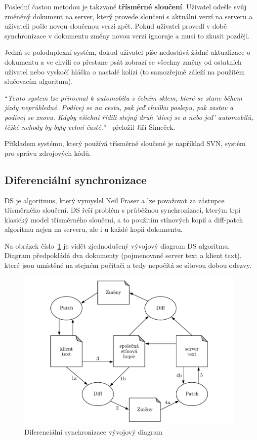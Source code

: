 Poslední častou metodou je takzvané \textbf{třísměrné sloučení}.
Uživatel odešle svůj změněný dokument na server, který provede sloučení s aktuální verzí na serveru a uživateli pošle novou sloučenou verzi zpět.
Pokud uživatel provedl v době synchronizace v dokumentu změny novou verzi ignoruje a musí to zkusit později.

Jedná se poloduplexní systém, dokud uživatel píše nedostává žádné aktualizace o dokumentu a ve chvíli co přestane psát zobrazí se všechny změny od ostatních uživatel nebo vyskočí hláška o nastalé kolizi (to samozřejmě záleží na použitém slučovacím algoritmu).~\cite{ds:neil_paper, ds:neil_video}

\enquote{\textit{Tento system lze přirovnat k automobilu s čelním sklem, které se stane během jízdy neprůhledné.
Podívej se na cestu, pak jeď chvilku poslepu, pak zastav a podívej se znovu.
Kdyby všichni řídili stejný druh \enquote{dívej se a nebo jeď} automobilů, těžké nehody by byly velmi časté.}}~\cite{ds:neil_paper} přeložil Jiří Šimeček.

Příkladem systému, který používá třísměrné sloučené je například \gls{SVN}, systém pro správu zdrojových kódů.

\subsection{Diferenciální synchronizace}\label{subsec:diferencialniSynchronizace}

\gls{DS} je algoritmus, který vymyslel Neil Fraser a lze považovat za zástupce třísměrného sloučení.
\gls{DS} řeší problém s průběžnou synchronizací, kterým trpí klasický model třísměrného sloučení, a to použitím stínových kopií a diff-patch algoritmu nejen na serveru, ale i u každé kopii dokumentu.

Na obrázek číslo~\ref{fig:DS_diagram} je vidět zjednodušený vývojový diagram \gls{DS} algoritmu.
Diagram předpokládá dva dokumenty (pojmenované server text a klient text), které jsou umístěné na stejném počítači a tedy nepočítá se síťovou dobou odezvy.

\begin{figure}[ht]
    \centering
    \includegraphics[width=\textwidth]{partials/analyza/DS_diagram.pdf}
    \caption{Diferenciální synchronizace vývojový diagram~\cite{ds:neil_paper}}\label{fig:DS_diagram}
\end{figure}


